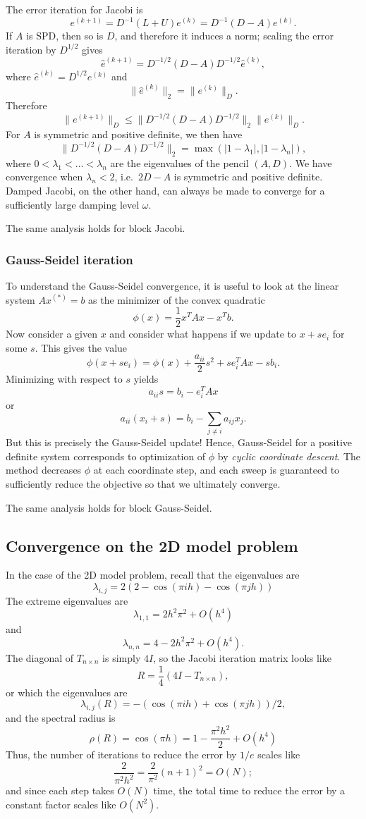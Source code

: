 The error iteration for Jacobi is
\[
  e^{(k+1)} = D^{-1} (L+U) e^{(k)} = D^{-1} (D-A) e^{(k)}.
\]
If $A$ is SPD, then so is $D$, and therefore it induces a norm;
scaling the error iteration by $D^{1/2}$ gives
\[
  \hat{e}^{(k+1)} = D^{-1/2} (D-A) D^{-1/2} \hat{e}^{(k)},
\]
where $\hat{e}^{(k)} = D^{1/2} e^{(k)}$ and
\[
  \|\hat{e}^{(k)}\|_2 = \|e^{(k)}\|_D.
\]
Therefore
\[
  \|e^{(k+1)}\|_D \leq \|D^{-1/2} (D-A) D^{-1/2}\|_2 \|e^{(k)}\|_D.
\]
For $A$ is symmetric and positive definite, we then have
\[
  \| D^{-1/2} (D-A) D^{-1/2} \|_2 = \max(|1-\lambda_1|, |1-\lambda_n|),
\]
where $0 < \lambda_1 < \ldots < \lambda_n$ are the eigenvalues of the
pencil $(A,D)$.  We have convergence when $\lambda_n < 2$,
i.e.~$2D-A$ is symmetric and positive definite.  Damped Jacobi, on
the other hand, can always be made to converge for a sufficiently
large damping level $\omega$.

The same analysis holds for block Jacobi.

\subsubsection{Gauss-Seidel iteration}

To understand the Gauss-Seidel convergence, it is useful to look at
the linear system $Ax^{(*)} = b$ as the minimizer of the convex quadratic
\[
  \phi(x) = \frac{1}{2} x^T A x - x^T b.
\]
Now consider a given $x$ and consider what happens if we update to
$x + s e_i$ for some $s$.  This gives the value
\[
  \phi(x+s e_i) = \phi(x) + \frac{a_{ii}}{2} s^2 + s e_i^T A x - s b_i.
\]
Minimizing with respect to $s$ yields
\[
  a_{ii} s = b_i - e_i^T A x
\]
or
\[
  a_{ii} (x_i + s) = b_i - \sum_{j \neq i} a_{ij} x_j.
\]
But this is precisely the Gauss-Seidel update!  Hence, Gauss-Seidel for
a positive definite system corresponds to optimization of $\phi$ by
{\em cyclic coordinate descent}.  The method decreases $\phi$ at each
coordinate step, and each sweep is guaranteed to sufficiently reduce
the objective so that we ultimately converge.

The same analysis holds for block Gauss-Seidel.

\subsection{Convergence on the 2D model problem}

In the case of the 2D model problem, recall that the eigenvalues are
\[
  \lambda_{i,j} =
  2\left(
    2-\cos(\pi i h)-\cos (\pi j h)
  \right)
\]
The extreme eigenvalues are
\[
  \lambda_{1,1} = 2 h^2 \pi^2 + O(h^4)
\]
and
\[
  \lambda_{n,n} = 4-2 h^2 \pi^2 + O(h^4).
\]
The diagonal of $T_{n\times n}$ is simply $4I$, so the Jacobi
iteration matrix looks like
\[
  R = \frac{1}{4} (4I-T_{n\times n}),
\]
or which the eigenvalues are
\[
  \lambda_{i,j}(R) = -(\cos(\pi i h)+\cos(\pi j h))/2,
\]
and the spectral radius is
\[
  \rho(R) = \cos(\pi h) = 1-\frac{\pi^2 h^2}{2} + O(h^4)
\]
Thus, the number of iterations to reduce the error by $1/e$ scales like
\[
  \frac{2}{\pi^2 h^2} = \frac{2}{\pi^2} (n+1)^2 = O(N);
\]
and since each step takes $O(N)$ time, the total time to reduce the
error by a constant factor scales like $O(N^2)$.


